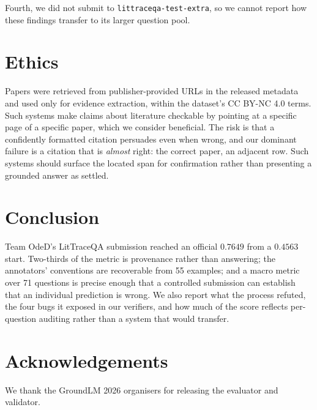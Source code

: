 \documentclass[11pt]{article}
\newcommand{\bk}{\allowbreak}
\begin{document}
Fourth, we did not submit to \texttt{littraceqa-\bk{}test-\bk{}extra}, so we cannot report
how these findings transfer to its larger question pool.

\section{Ethics}

Papers were retrieved from publisher-provided URLs in the released metadata and
used only for evidence extraction, within the dataset's CC BY-NC 4.0 terms. Such
systems make claims about literature checkable by pointing at a specific page of a
specific paper, which we consider beneficial. The risk is that a confidently
formatted citation persuades even when wrong, and our dominant failure is a
citation that is \emph{almost} right: the correct paper, an adjacent row. Such
systems should surface the located span for confirmation rather than presenting a
grounded answer as settled.

\section{Conclusion}

Team OdeD's LitTraceQA submission reached an official $0.7649$ from a $0.4563$
start. Two-thirds of the metric is provenance rather than answering; the
annotators' conventions are recoverable from 55 examples; and a macro metric over
71 questions is precise enough that a controlled submission can establish that an
individual prediction is wrong. We also report what the process refuted, the four
bugs it exposed in our verifiers, and how much of the score reflects per-question
auditing rather than a system that would transfer.

\section*{Acknowledgements}

We thank the GroundLM 2026 organisers for releasing the evaluator and validator.


\end{document}
